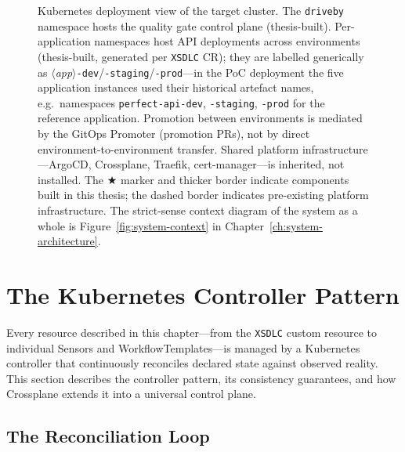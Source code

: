 \begin{figure}[htbp]
\centering
\resizebox{\textwidth}{!}{%
%
}
\caption[Kubernetes deployment view of the target cluster (thesis-built vs.\ inherited components).]{Kubernetes deployment view of the target cluster. The \texttt{driveby} namespace hosts the quality gate control plane (thesis-built). Per-application namespaces host API deployments across environments (thesis-built, generated per \texttt{XSDLC} CR); they are labelled generically as $\langle$\textit{app}$\rangle$\texttt{-dev}/\texttt{-staging}/\texttt{-prod}---in the PoC deployment the five application instances used their historical artefact names, e.g.\ namespaces \texttt{perfect-api-dev}, \texttt{-staging}, \texttt{-prod} for the reference application. Promotion between environments is mediated by the GitOps Promoter (promotion PRs), not by direct environment-to-environment transfer. Shared platform infrastructure---ArgoCD, Crossplane, Traefik, cert-manager---is inherited, not installed. The $\bigstar$ marker and thicker border indicate components built in this thesis; the dashed border indicates pre-existing platform infrastructure. The strict-sense context diagram of the system as a whole is Figure~\ref{fig:system-context} in Chapter~\ref{ch:system-architecture}.}
\label{fig:k8s-system-context}
\end{figure}

\section{The Kubernetes Controller Pattern}
\label{sec:controller-pattern}

Every resource described in this chapter---from the \texttt{XSDLC} custom resource to individual Sensors and WorkflowTemplates---is managed by a Kubernetes controller that continuously reconciles declared state against observed reality. This section describes the controller pattern, its consistency guarantees, and how Crossplane extends it into a universal control plane.

\subsection{The Reconciliation Loop}
\label{subsec:reconciliation-loop}

